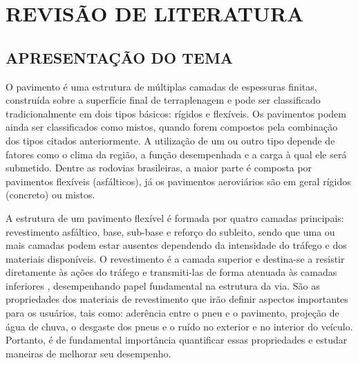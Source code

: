 \chapter{REVISÃO DE LITERATURA}\label{CAP2}

\section{APRESENTAÇÃO DO TEMA}
O pavimento é uma estrutura de múltiplas camadas de espessuras finitas, construída sobre a superfície final de terraplenagem \cite{bernuccipavimentaccao}  e pode ser classificado  tradicionalmente em dois tipos básicos: rígidos e flexíveis. Os pavimentos podem ainda ser classificados como mistos, quando forem compostos pela combinação dos tipos citados anteriormente.  A utilização de um ou outro tipo depende de fatores como o clima da região, a função desempenhada e a carga à qual ele será submetido. Dentre as rodovias brasileiras, a maior parte é composta por pavimentos flexíveis (asfálticos), já os pavimentos aeroviários são em geral rígidos (concreto) ou mistos. 

A estrutura de um pavimento flexível é formada por quatro camadas principais: revestimento asfáltico, base, sub-base e reforço do subleito, sendo que uma ou mais camadas podem estar ausentes dependendo da intensidade do tráfego e dos materiais disponíveis. O revestimento é a camada superior e destina-se a resistir diretamente às ações do tráfego e transmiti-las de forma atenuada às camadas inferiores \cite{bernuccipavimentaccao}, desempenhando papel fundamental na estrutura da via. São as propriedades dos materiais de revestimento que irão definir aspectos importantes para os usuários, tais como: aderência entre o pneu e o pavimento, projeção de água de chuva, o desgaste dos pneus e o ruído no exterior e no interior do veículo. Portanto, é de fundamental importância quantificar essas propriedades e estudar maneiras de melhorar seu desempenho. 

